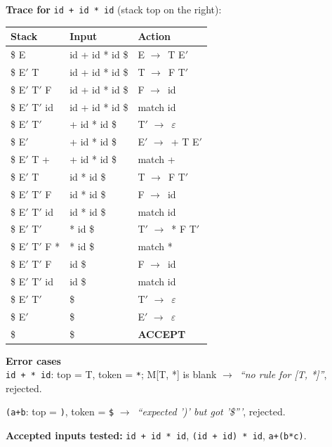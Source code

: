 \documentclass[10pt,a4paper]{article}
\newcommand{\eps}{$\varepsilon$}
\newcommand{\ar}{$\rightarrow$}
\newcommand{\tk}[1]{\texttt{#1}}
\begin{document}
\begin{minipage}[t]{0.56\textwidth}
\vspace{0pt}
\textbf{Trace for} \tk{id + id * id} (stack top on the right):\\[2pt]
\footnotesize
\begin{tabular}{@{}lll@{}}
\toprule
Stack & Input & Action \\
\midrule
\$ E & id + id * id \$ & E \ar\ T E$'$ \\
\$ E$'$ T & id + id * id \$ & T \ar\ F T$'$ \\
\$ E$'$ T$'$ F & id + id * id \$ & F \ar\ id \\
\$ E$'$ T$'$ id & id + id * id \$ & match id \\
\$ E$'$ T$'$ & + id * id \$ & T$'$ \ar\ \eps \\
\$ E$'$ & + id * id \$ & E$'$ \ar\ + T E$'$ \\
\$ E$'$ T + & + id * id \$ & match + \\
\$ E$'$ T & id * id \$ & T \ar\ F T$'$ \\
\$ E$'$ T$'$ F & id * id \$ & F \ar\ id \\
\$ E$'$ T$'$ id & id * id \$ & match id \\
\$ E$'$ T$'$ & * id \$ & T$'$ \ar\ * F T$'$ \\
\$ E$'$ T$'$ F * & * id \$ & match * \\
\$ E$'$ T$'$ F & id \$ & F \ar\ id \\
\$ E$'$ T$'$ id & id \$ & match id \\
\$ E$'$ T$'$ & \$ & T$'$ \ar\ \eps \\
\$ E$'$ & \$ & E$'$ \ar\ \eps \\
\$ & \$ & \textbf{ACCEPT} \\
\bottomrule
\end{tabular}
\end{minipage}\hfill
\begin{minipage}[t]{0.41\textwidth}
\vspace{0pt}
\textbf{Error cases}\\[2pt]
\tk{id + * id}: top = T, token = \tk{*}; M[T, *] is blank \ar\ \emph{``no rule for [T, *]''}, rejected.

\medskip
\tk{(a+b}: top = \tk{)}, token = \tk{\$} \ar\ \emph{``expected ')' but got '\$'''}, rejected.

\medskip
\textbf{Accepted inputs tested:} \tk{id + id * id}, \tk{(id + id) * id}, \tk{a+(b*c)}.
\end{minipage}
\end{document}
